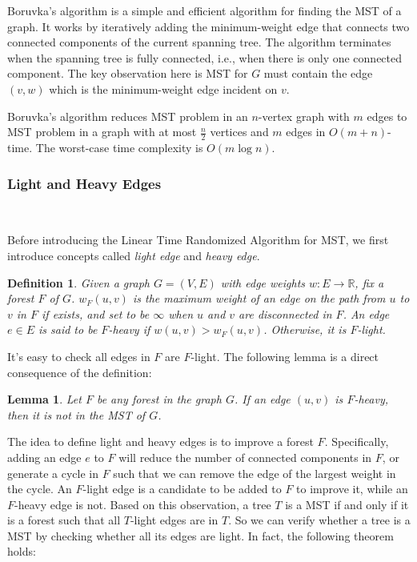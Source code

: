 \documentclass[11pt]{article}
\theoremstyle{plain}
\newtheorem{lemma}{Lemma}[section]
\newtheorem{definition}{Definition}[section]
\begin{document}
Boruvka's algorithm is a simple and efficient algorithm for finding the MST of a graph. It works by iteratively adding the minimum-weight edge that connects two connected components of the current spanning tree. The algorithm terminates when the spanning tree is fully connected, i.e., when there is only one connected component. The key observation here is MST for $G$ must contain the edge $(v,w)$ which is the minimum-weight edge incident on $v$.

Boruvka's algorithm reduces MST problem in an $n$-vertex graph with $m$ edges to MST problem in a graph with at most $\frac{n}{2}$ vertices and $m$ edges in $O(m+n)$-time. The worst-case time complexity is $O(m\log n)$.

\subsubsection{Light and Heavy Edges}\

Before introducing the Linear Time Randomized Algorithm for MST, we first introduce concepts called \textit{light edge} and \textit{heavy edge}.

\begin{definition}
    Given a graph $G=(V,E)$ with edge weights $w:E\to \mathbb{R}$, fix a forest $F$ of $G$. $w_F(u,v)$ is the maximum weight of an edge on the path from $u$ to $v$ in $F$ if exists, and set to be $\infty$ when $u$ and $v$ are disconnected in $F$. An edge $e\in E$ is said to be $F$-\textit{heavy} if $w(u,v)>w_F(u,v)$. Otherwise, it is $F$-\textit{light}.
\end{definition}

It's easy to check all edges in $F$ are $F$-light. The following lemma is a direct consequence of the definition:

\begin{lemma}
    Let $F$ be any forest in the graph $G$. If an edge $(u,v)$ is $F$-heavy, then it is not in the MST of $G$.
\end{lemma}

The idea to define light and heavy edges is to improve a forest $F$. Specifically, adding an edge $e$ to $F$ will reduce the number of connected components in $F$, or generate a cycle in $F$ such that we can remove the edge of the largest weight in the cycle. An $F$-light edge is a candidate to be added to $F$ to improve it, while an $F$-heavy edge is not. Based on this observation, a tree $T$ is a MST if and only if it is a forest such that all $T$-light edges are in $T$. So we can verify whether a tree is a MST by checking whether all its edges are light. In fact, the following theorem holds:
\end{document}
